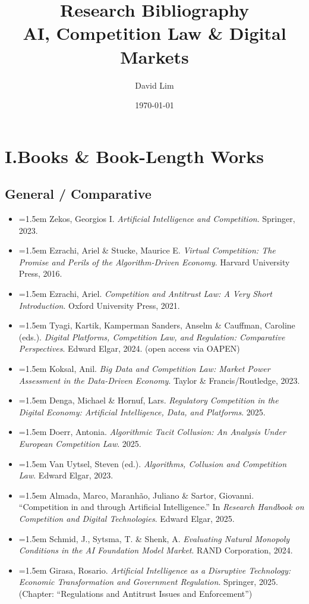\documentclass[12pt, letterpaper]{article}
\newcommand{\entry}[1]{%
  \item \hangindent=1.5em \hangafter=1 #1%
}
\begin{document}
\title{\textbf{Research Bibliography}\\[0.5ex]
\large AI, Competition Law \& Digital Markets}
\author{David Lim}
\date{\today}
\maketitle
\thispagestyle{empty}

\onehalfspacing
\tableofcontents
\newpage

\section{I.\quad Books \& Book-Length Works}

\subsection{General / Comparative}

\begin{itemize}
\entry{Zekos, Georgios I. \textit{Artificial Intelligence and Competition}. Springer, 2023.}
\entry{Ezrachi, Ariel \& Stucke, Maurice E. \textit{Virtual Competition: The Promise and Perils of the Algorithm-Driven Economy}. Harvard University Press, 2016.}
\entry{Ezrachi, Ariel. \textit{Competition and Antitrust Law: A Very Short Introduction}. Oxford University Press, 2021.}
\entry{Tyagi, Kartik, Kamperman Sanders, Anselm \& Cauffman, Caroline (eds.). \textit{Digital Platforms, Competition Law, and Regulation: Comparative Perspectives}. Edward Elgar, 2024. (open access via OAPEN)}
\entry{Koksal, Anil. \textit{Big Data and Competition Law: Market Power Assessment in the Data-Driven Economy}. Taylor \& Francis/Routledge, 2023.}
\entry{Denga, Michael \& Hornuf, Lars. \textit{Regulatory Competition in the Digital Economy: Artificial Intelligence, Data, and Platforms}. 2025.}
\entry{Doerr, Antonia. \textit{Algorithmic Tacit Collusion: An Analysis Under European Competition Law}. 2025.}
\entry{Van Uytsel, Steven (ed.). \textit{Algorithms, Collusion and Competition Law}. Edward Elgar, 2023.}
\entry{Almada, Marco, Maranhão, Juliano \& Sartor, Giovanni. ``Competition in and through Artificial Intelligence.'' In \textit{Research Handbook on Competition and Digital Technologies}. Edward Elgar, 2025.}
\entry{Schmid, J., Sytsma, T. \& Shenk, A. \textit{Evaluating Natural Monopoly Conditions in the AI Foundation Model Market}. RAND Corporation, 2024.}
\entry{Girasa, Rosario. \textit{Artificial Intelligence as a Disruptive Technology: Economic Transformation and Government Regulation}. Springer, 2025. (Chapter: ``Regulations and Antitrust Issues and Enforcement'')}
\end{itemize}
\end{document}
